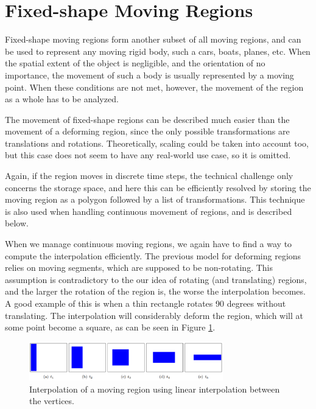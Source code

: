 \section{Fixed-shape Moving Regions}
\label{section:fixed_shape_regions}

Fixed-shape moving regions form another subset of all moving regions, and can be used to represent any moving rigid body, such a cars, boats, planes, etc. When the spatial extent of the object is negligible, and the orientation of no importance, the movement of such a body is usually represented by a moving point. When these conditions are not met, however, the movement of the region as a whole has to be analyzed.

The movement of fixed-shape regions can be described much easier than the movement of a deforming region, since the only possible transformations are translations and rotations. Theoretically, scaling could be taken into account too, but this case does not seem to have any real-world use case, so it is omitted.

Again, if the region moves in discrete time steps, the technical challenge only concerns the storage space, and here this can be efficiently resolved by storing the moving region as a polygon followed by a list of transformations. This technique is also used when handling continuous movement of regions, and is described below.

When we manage continuous moving regions, we again have to find a way to compute the interpolation efficiently. The previous model for deforming regions relies on moving segments, which are supposed to be non-rotating. This assumption is contradictory to the our idea of rotating (and translating) regions, and the larger the rotation of the region is, the worse the interpolation becomes. A good example of this is when a thin rectangle rotates 90 degrees without translating. The interpolation will considerably deform the region, which will at some point become a square, as can be seen in Figure \ref{fig:vertices_interpolation}.

\begin{figure}[h!]
    \centering
    \includegraphics[width=0.75\textwidth]{images/vertices_interpolation.png}
    \caption[Linear interpolation of the vertices of a moving region]{Interpolation of a moving region using linear interpolation between the vertices. \cite{fmregion}}
    \label{fig:vertices_interpolation}
\end{figure}


